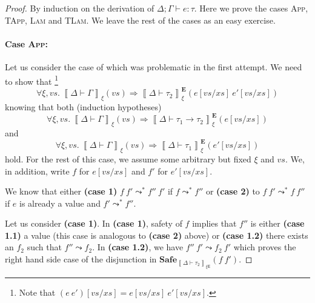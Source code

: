 \documentclass{article}
\newcommand{\EXP}{\mathsf{E}}
\newcommand{\semtyp}[3]{\left\llbracket #2 \vdash #3 \right\rrbracket_{#1}}
\newcommand{\semErel}[1]{#1^{\textbf{E}}}
\newcommand{\semenv}{\xi}
\newcommand{\Tctx}{\Gamma}
\newcommand{\CtxTps}{\Delta}
\newcommand{\expr}{e}
\newcommand{\exprB}{f}
\newcommand{\typ}{\tau}
\newcommand{\typed}[4]{#1; #2 \vdash #3 : #4}
\newcommand{\step}{\leadsto}
\newcommand{\steps}{\leadsto^*}
\begin{document}
\begin{proof}
By induction on the derivation of $\typed{\CtxTps}{\Tctx}{\expr}{\typ}$.
Here we prove the cases \textsc{App}, \textsc{TApp},
\textsc{Lam} and \textsc{TLam}.
We leave the rest of the cases as an easy exercise.

\paragraph{Case \textsc{App}:}
Let us consider the case of  which was problematic in the first attempt.
We need to show that
\footnote{Note that
$(\expr~\expr')[\mathit{vs}/\mathit{xs}] = \expr[\mathit{vs}/\mathit{xs}]~\expr'[\mathit{vs}/\mathit{xs}]$.}
\[
\forall \semenv, \mathit{vs}.~\semtyp{\semenv}{\CtxTps}{\Tctx}(\mathit{vs}) \Rightarrow
\semErel{\semtyp{\semenv}{\CtxTps}{\typ_2}}(\expr[\mathit{vs}/\mathit{xs}]~\expr'[\mathit{vs}/\mathit{xs}])
\]
knowing that both (induction hypotheses)
\[\forall \semenv, \mathit{vs}.~\semtyp{\semenv}{\CtxTps}{\Tctx}(\mathit{vs}) \Rightarrow \semErel{\semtyp{\semenv}{\CtxTps}{\typ_1 \to \typ_2}}(\expr[\mathit{vs}/\mathit{xs}])
\]
and
\[
\forall \semenv, \mathit{vs}.~\semtyp{\semenv}{\CtxTps}{\Tctx}(\mathit{vs}) \Rightarrow
\semErel{\semtyp{\semenv}{\CtxTps}{\typ_1}}(\expr'[\mathit{vs}/\mathit{xs}])
\]
hold.
For the rest of this case, we assume some arbitrary but fixed $\semenv$ and $\mathit{vs}$.
We, in addition, write $f$ for $\expr[\mathit{vs}/\mathit{xs}]$
and $f'$ for $e'[\mathit{vs}/\mathit{xs}]$.

We know that either \textbf{(case 1)} $f~f' \steps f''~f'$ if $f \steps f''$
or \textbf{(case 2)} to $f~f' \steps f~f''$ if $\expr$ is already a value and $f' \steps f''$.

Let us consider \textbf{(case 1)}.
In \textbf{(case 1)}, safety of $\exprB$ implies that $\exprB''$ is either \textbf{(case 1.1)} a value (this case is analogous to \textbf{(case 2)} above) or \textbf{(case 1.2)} there exists an $\exprB_2$ such that $\exprB'' \step \exprB_2$. In \textbf{(case 1.2)}, we have $\exprB''~\exprB' \step \exprB_2~\exprB'$ which proves
the right hand side case of the disjunction in $\mathbf{Safe}_{\semtyp{\semenv\EXP}{\CtxTps}{\typ_2}}(\exprB~\exprB')$.


\end{proof}
\end{document}
